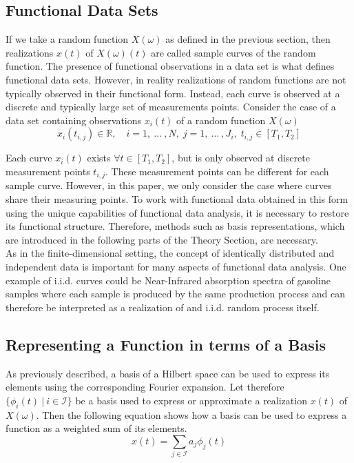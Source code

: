 \documentclass[11pt,twoside,a4paper]{article}
\begin{document}
	\subsection{Functional Data Sets}
	If we take a random function $X(\omega)$ as defined in the previous section, then realizations $x(t)$ of $X(\omega)(t)$ are called sample curves of the random function. The presence of functional observations in a data set is what defines functional data sets. However, in reality realizations of random functions are not typically observed in their functional form. Instead, each curve is observed at a discrete and typically large set of measurements points. Consider the case of a data set containing observations $x_i(t)$ of a random function $X(\omega)$
	\begin{equation}
		x_{i}(t_{i,j}) \in \mathbb{R}, \quad i = 1,\: \dots\: ,N, \; j = 1, \: \dots \:, J_i, \; t_{i,j} \in [T_1, T_2]
	\end{equation}
	
	Each curve $x_i(t)$ exists $\forall t \in [T_1, T_2]$, but is only observed at discrete measurement points $t_{i,j}$. These measurement points can be different for each sample curve. However, in this paper, we only consider the case where curves share their measuring points. 
	To work with functional data obtained in this form using the unique capabilities of functional data analysis, it is necessary to restore its functional structure. Therefore, methods such as basis representations, which are introduced in the following parts of the Theory Section, are necessary.\\
	
	As in the finite-dimensional setting, the concept of identically distributed and independent data is important for many aspects of functional data analysis. One example of i.i.d. curves could be Near-Infrared absorption spectra of gasoline samples where each sample is produced by the same production process and can therefore be interpreted as a realization of and i.i.d. random process itself.
	
	\subsection{Representing a Function in terms of a Basis} 
	As previously described, a basis of a Hilbert space can be used to express its elements using the corresponding Fourier expansion. Let therefore $\{\phi_i(t) \: \vert \: i \in \mathcal{I}\}$ be a basis used to express or approximate a realization $x(t)$ of $X(\omega)$. Then the following equation shows how a basis can be used to express a function as a weighted sum of its elements.
	\begin{equation}
		x(t) = \sum_{j \in \mathcal{I}} a_j \phi_j(t) 
	\end{equation}
	
\end{document}
